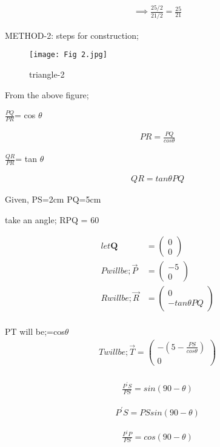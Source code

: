 \documentclass[a4paper,12pt,two column]{article}
\theoremstyle{remark}
\newcommand{\myvec}[1]{\ensuremath{\begin{pmatrix}#1\end{pmatrix}}}
\let\vec\mathbf
\begin{document}
\begin{align}
\implies \frac{25/2}{21/2}=\frac{25}{21}
\end{align} 

\centering
{}

METHOD-2: steps for construction;

\begin{figure}[bht]
    \texttt{[image: Fig 2.jpg]}
    \caption{triangle-2}
    \label{}
\end{figure}

From the above figure;

    $\frac{PQ}{PR}$= cos $\theta$

\begin{align}
    PR = \frac{PQ}{cos\theta}
\end{align}

    $\frac{QR}{PR}$= tan $\theta$

\begin{align}
    QR = tan \theta PQ
\end{align}

Given, PS=2cm PQ=5cm 

take an angle;
\angle RPQ = 60{\degree}

\begin{align}
    let \vec{Q} &=\myvec{0 \\ 0}\\
    P will be; \Vec{P} &=\myvec{-5 \\ 0}\\
    R will be; \Vec{R} &=\myvec{0 \\ -tan\theta PQ}\\
\end{align}

PT will be;\implies {}=cos$\theta$
\begin{align}
    T will be; \Vec{T}=\myvec{-(5-\frac{PS}{cos\theta}) \\ 0}\\
\end{align}    
 
\begin{align}
    \frac{P^\prime S}{PS} = sin(90-\theta)
\end{align}     

\begin{align}
    P^\prime S = PS sin(90-\theta) 
\end{align}  
   
\begin{align}
    \frac{P^\prime P}{PS} = cos(90-\theta)
\end{align}   
   
\end{document}
